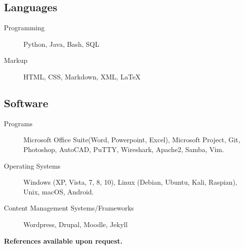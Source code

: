 \documentclass{article}
\begin{document}
\subsection{Languages}
\begin{description}
\item[Programming] Python, Java, Bash, SQL
\item[Markup] HTML, CSS, Markdown, XML, {\LaTeX}
\end{description}

\subsection{Software}

\begin{description}
\item[Programs] Microsoft Office Suite(Word, Powerpoint, Excel), Microsoft Project, Git, Photoshop, AutoCAD, PuTTY, Wireshark, Apache2, Samba, Vim.
\item[Operating Systems] Windows (XP, Vista, 7, 8, 10), Linux (Debian, Ubuntu, Kali, Raspian), Unix,  macOS, Android. 
\item[Content Management Systems/Frameworks] Wordpress, Drupal, Moodle, Jekyll
\end{description}



\begin{center}
\textbf{References available upon request.}
\end{center}
\end{document}
